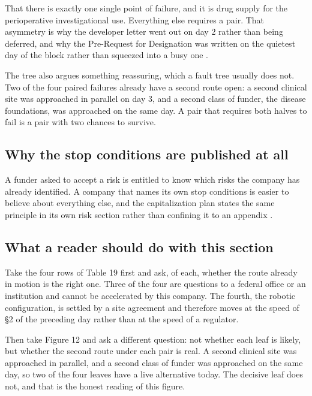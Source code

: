That there is exactly one single point of failure, and it is drug supply for the
perioperative investigational use. Everything else requires a pair. That
asymmetry is why the developer letter went out on day 2 rather than being
deferred, and why the Pre-Request for Designation was written on the quietest day
of the block rather than squeezed into a busy one \cite{fdacombination2026}.

The tree also argues something reassuring, which a fault tree usually does not.
Two of the four paired failures already have a second route open: a second
clinical site was approached in parallel on day 3, and a second class of funder,
the disease foundations, was approached on the same day. A pair that requires
both halves to fail is a pair with two chances to survive.

\subsection{Why the stop conditions are published at all}

A funder asked to accept a risk is entitled to know which risks the company has
already identified. A company that names its own stop conditions is easier to
believe about everything else, and the capitalization plan states the same
principle in its own risk section rather than confining it to an appendix
\cite{capitalplan2026}.

\subsection{What a reader should do with this section}

Take the four rows of Table 19 first and ask, of each, whether the route already
in motion is the right one. Three of the four are questions to a federal office
or an institution and cannot be accelerated by this company. The fourth, the
robotic configuration, is settled by a site agreement and therefore moves at the
speed of \S2 of the preceding day rather than at the speed of a regulator.

Then take Figure 12 and ask a different question: not whether each leaf is
likely, but whether the second route under each pair is real. A second clinical
site was approached in parallel, and a second class of funder was approached on
the same day, so two of the four leaves have a live alternative today. The
decisive leaf does not, and that is the honest reading of this figure.

